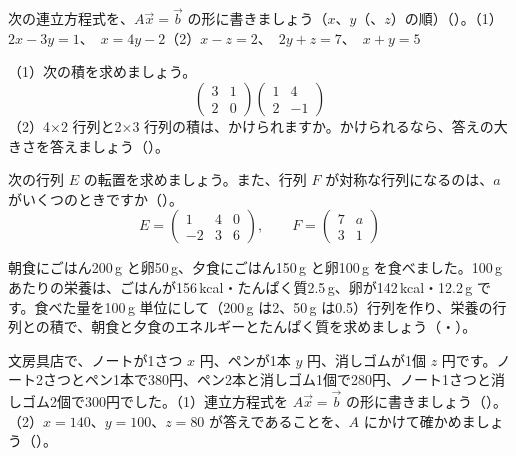 \bkproblem 次の連立方程式を、$A\vec x=\vec b$ の形に書きましょう（$x$、$y$（、$z$）の順）\mbox{（）}。\newline（1）$2x-3y=1$、\ $x=4y-2$\newline（2）$x-z=2$、\ $2y+z=7$、\ $x+y=5$

\bkproblem （1）次の積を求めましょう。
\[ \begin{pmatrix} 3 & 1\\ 2 & 0 \end{pmatrix}\begin{pmatrix} 1 & 4\\ 2 & -1 \end{pmatrix} \]
（2）4×2 行列と2×3 行列の積は、かけられますか。かけられるなら、答えの大きさを答えましょう\mbox{（）}。

\bkproblem 次の行列 $E$ の転置を求めましょう。また、行列 $F$ が対称な行列になるのは、$a$ がいくつのときですか\mbox{（）}。
\[ E=\begin{pmatrix} 1 & 4 & 0\\ -2 & 3 & 6 \end{pmatrix},\qquad F=\begin{pmatrix} 7 & a\\ 3 & 1 \end{pmatrix} \]


\bkproblem 朝食にごはん200\,g と卵50\,g、夕食にごはん150\,g と卵100\,g を食べました。100\,g あたりの栄養は、ごはんが156\,kcal・たんぱく質2.5\,g、卵が142\,kcal・12.2\,g です。食べた量を100\,g 単位にして（200\,g は2、50\,g は0.5）行列を作り、栄養の行列との積で、朝食と夕食のエネルギーとたんぱく質を求めましょう\mbox{（・）}。

\bkproblem 文房具店で、ノートが1さつ $x$ 円、ペンが1本 $y$ 円、消しゴムが1個 $z$ 円です。ノート2さつとペン1本で380円、ペン2本と消しゴム1個で280円、ノート1さつと消しゴム2個で300円でした。\newline（1）連立方程式を $A\vec x=\vec b$ の形に書きましょう\mbox{（）}。\newline（2）$x=140$、$y=100$、$z=80$ が答えであることを、$A$ にかけて確かめましょう\mbox{（）}。

